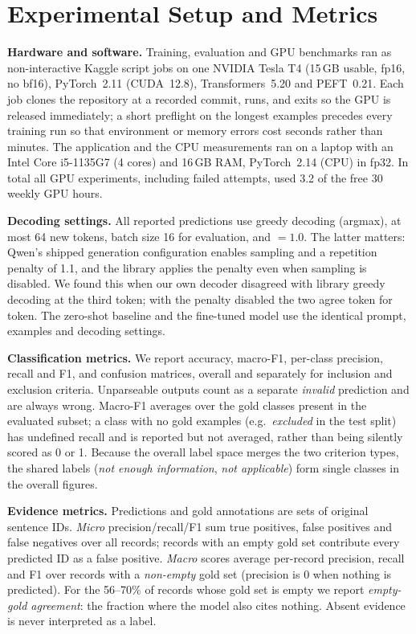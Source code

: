 \section{Experimental Setup and Metrics}
\label{sec:setup}

\textbf{Hardware and software.} Training, evaluation and GPU benchmarks ran as non-interactive
Kaggle script jobs on one NVIDIA Tesla T4 (15\,GB usable, fp16, no bf16), PyTorch~2.11 (CUDA~12.8),
Transformers~5.20 and PEFT~0.21. Each job clones the repository at a recorded commit, runs, and
exits so the GPU is released immediately; a short preflight on the longest examples precedes every
training run so that environment or memory errors cost seconds rather than minutes. The application
and the CPU measurements ran on a laptop with an Intel Core i5-1135G7 (4 cores) and 16\,GB RAM,
PyTorch~2.14 (CPU) in fp32. In total all GPU experiments, including failed attempts, used 3.2 of the free 30 weekly GPU hours.

\textbf{Decoding settings.} All reported predictions use greedy decoding (argmax), at most 64 new
tokens, batch size 16 for evaluation, and $=1.0$. The latter matters:
Qwen's shipped generation configuration enables sampling and a repetition penalty of 1.1, and the
library applies the penalty even when sampling is disabled. We found this when our own decoder
disagreed with library greedy decoding at the third token; with the penalty disabled the two agree
token for token. The zero-shot baseline and the fine-tuned model use the identical prompt, examples
and decoding settings.

\textbf{Classification metrics.} We report accuracy, macro-F1, per-class precision, recall and F1, and
confusion matrices, overall and separately for inclusion and exclusion criteria. Unparseable outputs
count as a separate \emph{invalid} prediction and are always wrong. Macro-F1 averages over the gold
classes present in the evaluated subset; a class with no gold examples (e.g.\ \emph{excluded} in the
test split) has undefined recall and is reported but not averaged, rather than being silently scored
as 0 or 1. Because the overall label space merges the two criterion types, the shared labels
(\emph{not enough information}, \emph{not applicable}) form single classes in the overall figures.

\textbf{Evidence metrics.} Predictions and gold annotations are sets of original sentence IDs.
\emph{Micro} precision/recall/F1 sum true positives, false positives and false negatives over all
records; records with an empty gold set contribute every predicted ID as a false positive.
\emph{Macro} scores average per-record precision, recall and F1 over records with a \emph{non-empty}
gold set (precision is 0 when nothing is predicted). For the 56--70\% of records whose gold set is
empty we report \emph{empty-gold agreement}: the fraction where the model also cites nothing. Absent
evidence is never interpreted as a label.

